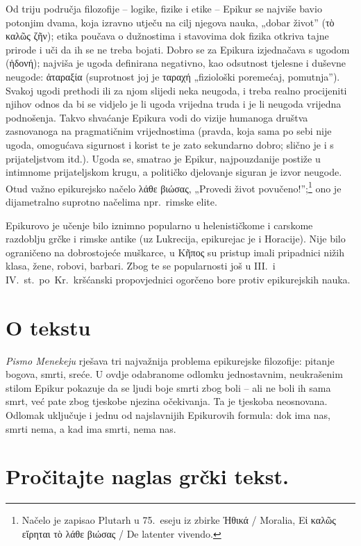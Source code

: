 Od triju područja filozofije – logike, fizike i etike – Epikur se najviše bavio potonjim dvama, koja izravno utječu na cilj njegova nauka, „dobar život” \textgreek{(τὸ καλῶς ζῆν)}; etika poučava o dužnostima i stavovima dok fizika otkriva tajne prirode i uči da ih se ne treba bojati. Dobro se za Epikura izjednačava s ugodom \textgreek{(ἡδονή)}; najviša je ugoda definirana negativno, kao odsutnost tjelesne i duševne neugode: \textgreek{ἀταραξία} (suprotnost joj je ταραχή „fiziološki poremećaj, pomutnja”). Svakoj ugodi prethodi ili za njom slijedi neka neugoda, i treba realno procijeniti njihov odnos da bi se vidjelo je li ugoda vrijedna truda i je li neugoda vrijedna podnošenja. Takvo shvaćanje Epikura vodi do vizije humanoga društva zasnovanoga na pragmatičnim vrijednostima (pravda, koja sama po sebi nije ugoda, omogućava sigurnost i korist te je zato sekundarno dobro; slično je i s prijateljstvom itd.). Ugoda se, smatrao je Epikur, najpouzdanije postiže u intimnome prijateljskom krugu, a političko djelovanje siguran je izvor neugode. Otud važno epikurejsko načelo \textgreek{λάθε βιώσας}, „Provedi život povučeno!”;\footnote{Načelo je zapisao Plutarh u 75.\ eseju iz zbirke Ἠθικά / Moralia, \textgreek{Εἰ καλῶς εἴρηται τὸ λάθε βιώσας} / De latenter vivendo.} ono je dijametralno suprotno načelima npr.\ rimske elite.

Epikurovo je učenje bilo iznimno popularno u helenističkome i carskome razdoblju grčke i rimske antike (uz Lukrecija, epikurejac je i Horacije). Nije bilo ograničeno na dobrostojeće muškarce, u \textgreek{Κῆπος} su pristup imali pripadnici nižih klasa, žene, robovi, barbari. Zbog te se popularnosti još u III.\ i IV.~st.\ po~Kr.\ kršćanski propovjednici ogorčeno bore protiv epikurejskih nauka.

\section*{O tekstu}

\textit{Pismo Menekeju} rješava tri najvažnija problema epikurejske filozofije: pitanje bogova, smrti, sreće. U ovdje odabranome odlomku jednostavnim, neukrašenim stilom Epikur pokazuje da se ljudi boje smrti zbog boli – ali ne boli ih sama smrt, već pate zbog tjeskobe njezina očekivanja. Ta je tjeskoba neosnovana. Odlomak uključuje i jednu od najslavnijih Epikurovih formula: dok ima nas, smrti nema, a kad ima smrti, nema nas.


\section*{Pročitajte naglas grčki tekst.}

